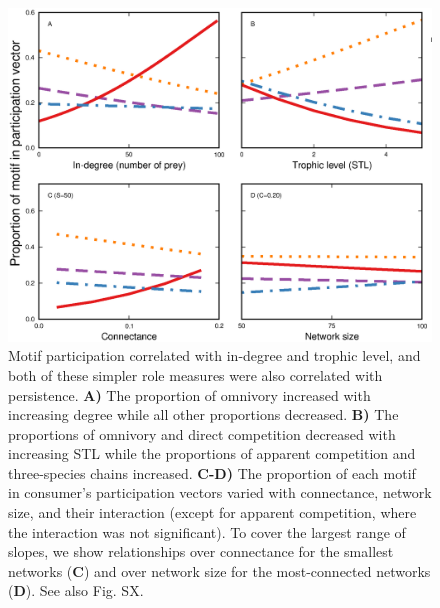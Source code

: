 \documentclass[12pt]{article}
\begin{document}
\begin{spacing}{2.0}
    \begin{figure}[hb!]
        \centering
        \includegraphics[width=\textwidth]{figures/roles_vs_TL.eps}
        \caption{Motif participation correlated with in-degree and trophic level, and both of these simpler role measures were also correlated with persistence. \textbf{A)} The proportion of omnivory increased with increasing degree while all other proportions decreased. \textbf{B)} The proportions of omnivory and direct competition decreased with increasing STL while the proportions of apparent competition and three-species chains increased. \textbf{C-D)} The proportion of each motif in consumer's participation vectors varied with connectance, network size, and their interaction (except for apparent competition, where the interaction was not significant). To cover the largest range of slopes, we show relationships over connectance for the smallest networks (\textbf{C}) and over network size for the most-connected networks (\textbf{D}). See also Fig. SX. }
        \label{fig:motifs_vs_TL_and_deg}
    \end{figure}        






\end{spacing}
\end{document}
